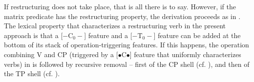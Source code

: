 \documentclass[output=paper]{langsci/langscibook}
\begin{document}

If restructuring does not take place, that is all there is to say. However, if
the matrix  predicate has the restructuring property, the derivation
proceeds as in . The lexical property that characterizes a
restructuring verb in the present approach is that a [$-\text{C}_0-$] feature
and a [$-\text{T}_0-$] feature can be added at the bottom of its stack of
operation-triggering features. If this happens, the  operation combining V
and CP (triggered by a [{\small $\bullet$}C{\small $\bullet$}] feature that
uniformly characterizes  verbs) in  is followed by
recursive removal -- first of the CP shell (cf. ), and then
of the TP shell (cf. ).%
\end{document}
